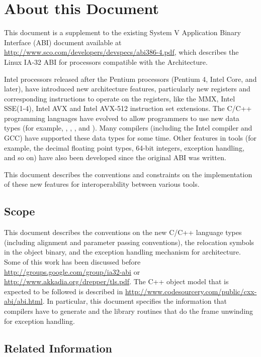 \chapter{About this Document\label{intro}}

This document is a supplement to the existing \xARCH System V
Application Binary Interface (ABI) document available at
\url{http://www.sco.com/developers/devspecs/abi386-4.pdf},
which describes the Linux IA-32 ABI for processors compatible with the
\xARCH Architecture.

Intel processors released after the Pentium processors (Pentium 4,
Intel Core, and later), have introduced new architecture features,
particularly new registers and corresponding instructions to operate on
the registers, like the MMX, Intel SSE(1-4), Intel AVX and Intel
AVX-512 instruction
set extensions. The C/C++ programming languages have evolved to allow
programmers to use new data types (for example, ,
, , and ).
Many compilers (including the Intel
compiler and GCC) have supported these data types for some time. Other
features in tools (for example, the decimal floating point types, 64-bit
integers, exception handling, and so on) have also been developed since
the original ABI was written.

This document describes the conventions and constraints on the
implementation of these new features for interoperability between
various tools.

\section{Scope}

This document describes the conventions on the new C/C++ language types
(including alignment and parameter passing conventions), the relocation
symbols in the object binary, and the exception handling mechanism for
\xARCH architecture.  Some of this work has been discussed before
\url{http://groups.google.com/group/ia32-abi} or
\url{http://www.akkadia.org/drepper/tls.pdf}. The C++ object model that
is expected to be followed is described in
\url{http://www.codesourcery.com/public/cxx-abi/abi.html}.  In particular,
this document specifies the information that compilers have to generate
and the library routines that do the frame unwinding for exception
handling.

\section{Related Information}

